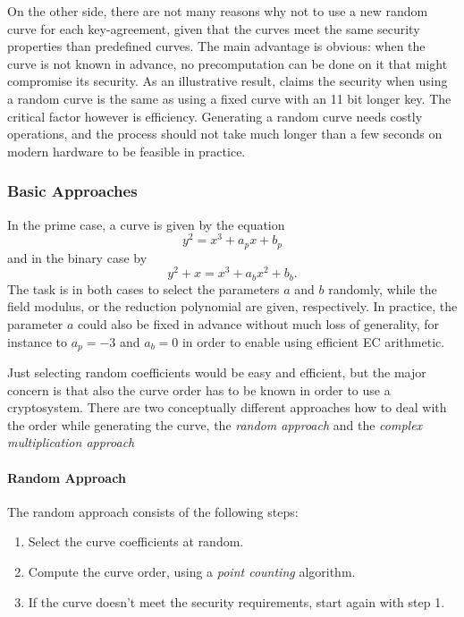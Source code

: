 \documentclass[11pt,english]{article}
\begin{document}
On the other side, there are not many reasons why not to use a new random curve for each key-agreement, given that the curves meet the same security properties than predefined curves.
The main advantage is obvious: when the curve is not known in advance, no precomputation can be done on it that might compromise its security. As an illustrative result, \cite{fixed} claims the security when using a random curve is the same as using a fixed curve with an 11 bit longer key.
The critical factor however is efficiency. Generating a random curve needs costly operations, and the process should not take much longer than a few seconds on modern hardware to be feasible in practice.

\subsubsection{Basic Approaches}
In the prime case, a curve is given by the equation
\begin{displaymath}
 y^2=x^3+a_px+b_p
\end{displaymath}
and in the binary case by
\begin{displaymath}
 y^2+x=x^3+a_bx^2+b_b.
\end{displaymath}
The task is in both cases to select the parameters $a$ and $b$ randomly, while the field modulus, or the reduction polynomial are given, respectively. In practice, the parameter $a$ could also be fixed in advance without much loss of generality, for instance to $a_p=-3$ and $a_b=0$ in order to enable using efficient EC arithmetic.

Just selecting random coefficients would be easy and efficient, but the major concern is that also the curve order has to be known in order to use a cryptosystem. There are two conceptually different approaches how to deal with the order while generating the curve, the \emph{random approach} and the \emph{complex multiplication approach}

\paragraph{Random Approach}
The random approach consists of the following steps:
\begin{enumerate}
 \item Select the curve coefficients at random.
 \item Compute the curve order, using a \emph{point counting} algorithm.
 \item If the curve doesn't meet the security requirements, start again with step 1.
\end{enumerate}
\end{document}
